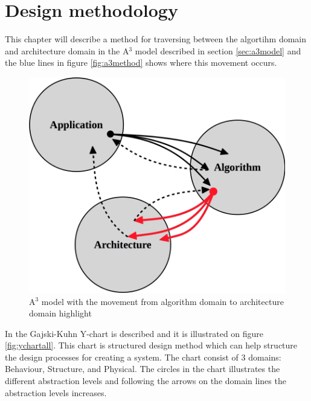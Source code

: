 \chapter{Design methodology} \label{ch:designmet}
This chapter will describe a method for traversing between the algortihm domain and architecture domain in the A$^3$ model described in section \vref{sec:a3model} and the blue lines in figure \vref{fig:a3method} shows where this movement occurs.\\

\begin{figure}[ht!]
  \centering
  \includegraphics[scale=0.25]{figures/a3design}
  \caption{A$^3$ model with the movement from algorithm domain to architecture domain highlight}
  \label{fig:a3method}
\end{figure}

In \cite{gajski} the Gajski-Kuhn Y-chart is described and it is illustrated on figure \vref{fig:ychartall}. This chart is structured design method which can help structure the design processes for creating a system. The chart consist of 3 domains: Behaviour, Structure, and Physical. The circles in the chart illustrates the different abstraction levels and following the arrows on the domain lines the abstraction levels increases.

